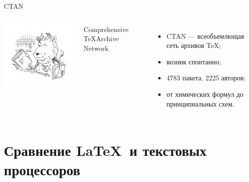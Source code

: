 \begin{frame}{CTAN}
    \begin{columns}
        \centering
        \includegraphics[width=1\linewidth]{../Figures/ctan.png}

        Comprehensive \TeX Archive Network
        \begin{itemize}
            \pause\item CTAN --- всеобъемлющая сеть архивов \TeX;
            \pause\item возник спонтанно;
            \pause\item 4783 пакета, 2225 авторов;
            \pause\item от химических формул до принципиальных схем.
        \end{itemize}
    \end{columns}
\end{frame}

\section{Сравнение \LaTeX~и текстовых процессоров} %



